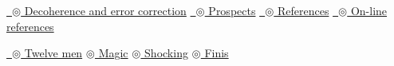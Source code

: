 \documentclass{article}
\def\pagedone{\newpage}
\def\tthdump#1{#1}
\begin{document}
\tthdump{\hyperlink{Decoherence and error correction}
               {\ $\circledcirc$ Decoherence and error correction\newline}}
\tthdump{\hyperlink{Prospects}
               {\ $\circledcirc$ Prospects\newline}}
\tthdump{\hyperlink{References}
               {\ $\circledcirc$ References\newline}}
\tthdump{\hyperlink{On-line references}
               {\ $\circledcirc$ On-line references\newline}}

\pagedone



\tthdump{\hyperlink{Twelve men}
               {\ $\circledcirc$ Twelve men\newline}}
\tthdump{\hyperlink{Magic}
	        {$\circledcirc$ Magic\newline}}
\tthdump{\hyperlink{Shocking}
	        {$\circledcirc$ Shocking\newline}}
\tthdump{\hyperlink{Finis}
	        {$\circledcirc$ Finis\newline}}
\end{document}
